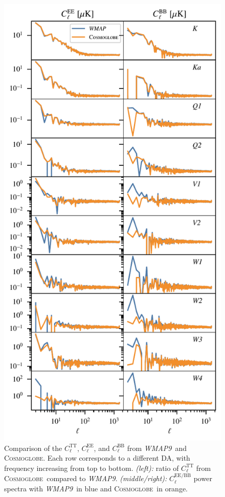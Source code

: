 \documentclass[twocolumn]{../../common/aa}
\def\WMAPnine{\emph{WMAP9}}
\newcommand{\cosmoglobe}{\textsc{Cosmoglobe}}
\begin{document}
\begin{figure}
	\includegraphics{figures/EE_BB_spec.pdf}
	\caption{Comparison of the $C_\ell^\mathrm{TT}$, $C_\ell^\mathrm{EE}$, and $C_\ell^\mathrm{BB}$ from \WMAPnine\ and \cosmoglobe. Each row corresponds to a different DA, with frequency increasing from top to bottom. \textit{(left):} ratio of $C_\ell^\mathrm{TT}$ from \cosmoglobe\ compared to \WMAPnine. \textit{(middle/right):} $C_\ell^\mathrm{EE/BB}$ power spectra with \WMAPnine\ in blue and \cosmoglobe\ in orange.}
	\label{fig:map_spectra}
\end{figure}
\end{document}
